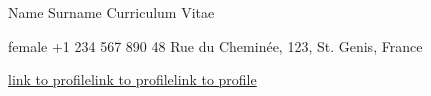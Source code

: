 \documentclass{template}
\begin{document}

{Name Surname}
{Curriculum Vitae}


\hspace{1.5cm}
\begin{minipage}{0.6\textwidth}
    {female}
    {+1 234 567 890 }
    {48 Rue du Cheminée, 123, St. Genis, France}
\end{minipage}
\hspace{-2cm}
\begin{minipage}{0.5\textwidth}
    {\href{https://github.com/example}{link to profile}}{\href{https://www.linkedin.com/in/example/}{link to profile}}{\href{https://www.researchgate.net/profile/example}{link to profile}}
\end{minipage}


\end{document}
